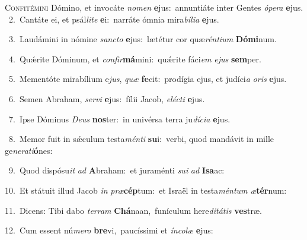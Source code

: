\lettrine{\initial\textcolor{\initialcolor}{C}}{onfitémini} Dómino, et invocáte \textit{no}\-\textit{men} \textbf{e}\-jus:~\star annuntiáte inter Gentes \textit{ó}\-\textit{pe}\textit{ra} \textbf{e}\-jus.\\
{\numbfont\textcolor{\numbcolor}{~2.}}~Cantáte ei, et psál\-\textit{li}\-\textit{te} \textbf{e}\-i:~\star narráte ómnia mira\-\textit{bí}\-\textit{li}\textit{a} \textbf{e}\-jus.\par
{\numbfont\textcolor{\numbcolor}{~3.}}~Laudámini in nómine \textit{sanc}\-\textit{to} \textbf{e}\-jus:~\star lætétur cor quæ\-\textit{rén}\-\textit{ti}\textit{um} \textbf{Dó}\-\textbf{mi}num.\par
{\numbfont\textcolor{\numbcolor}{~4.}}~Quǽrite Dóminum, et \textit{con}\-\textit{fir}\textbf{má}mini:~\star quǽrite fáci\textit{em} \textit{e}\-\textit{jus} \textbf{sem}\-per.\par
{\numbfont\textcolor{\numbcolor}{~5.}}~Mementóte mirabílium e\-\textit{jus}\-, \textit{quæ} \textbf{fe}\-cit:~\star prodígia ejus, et judíci\textit{a} \textit{o}\-\textit{ris} \textbf{e}\-jus.\par
{\numbfont\textcolor{\numbcolor}{~6.}}~Semen Abraham, \textit{ser}\-\textit{vi} \textbf{e}\-jus:~\star fílii Jacob, \textit{e}\-\textit{léc}\textit{ti} \textbf{e}\-jus.\par
{\numbfont\textcolor{\numbcolor}{~7.}}~Ipse Dóminus \textit{De}\-\textit{us} \textbf{nos}\-ter:~\star in univérsa terra ju\-\textit{dí}\-\textit{ci}\textit{a} \textbf{e}\-jus.\par
{\numbfont\textcolor{\numbcolor}{~8.}}~Memor fuit in sǽculum testa\-\textit{mén}\-\textit{ti} \textbf{su}\-i:~\star verbi, quod mandávit in mille ge\-\textit{ne}\-\textit{ra}\textit{ti}\textbf{ó}nes:\par
{\numbfont\textcolor{\numbcolor}{~9.}}~Quod dispósu\textit{it} \textit{ad} \textbf{A}\-braham:~\star et juraménti \textit{su}\-\textit{i} \textit{ad} \textbf{I}\-\textbf{sa}ac:\par
{\numbfont\textcolor{\numbcolor}{10.}}~Et státuit illud Jacob \textit{in} \textit{præ}\-\textbf{cép}tum:~\star et Israël in testa\-\textit{mén}\-\textit{tum} \textit{æ}\-\textbf{tér}num:\par
{\numbfont\textcolor{\numbcolor}{11.}}~Dicens: Tibi dabo \textit{ter}\-\textit{ram} \textbf{Chá}\-naan,~\star funículum here\-\textit{di}\-\textit{tá}\textit{tis} \textbf{ves}\-træ.\par
{\numbfont\textcolor{\numbcolor}{12.}}~Cum essent nú\-\textit{me}\-\textit{ro} \textbf{bre}\-vi,~\star paucíssimi et \textit{ín}\-\textit{co}\textit{læ} \textbf{e}\-jus:\par
